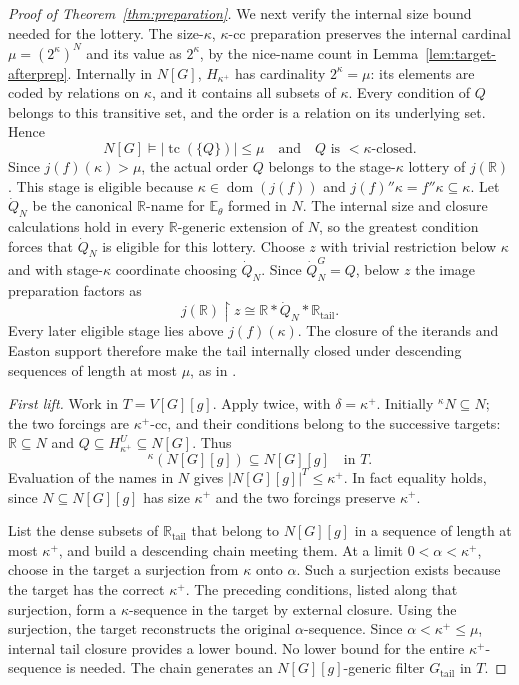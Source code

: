 \documentclass[10pt,a4paper]{amsart}
\theoremstyle{definition}
\theoremstyle{remark}
\newcommand{\RR}{\mathbb R}
\newcommand{\EE}{\mathbb E}
\DeclareMathOperator{\dom}{dom}
\DeclareMathOperator{\tc}{tc}
\begin{document}
\begin{proof}[Proof of Theorem~\ref{thm:preparation}]
We next verify the internal size bound needed for the
lottery. The size-\(\kappa\), \(\kappa\)-cc preparation
preserves the internal cardinal
\(\mu=(2^\kappa)^N\) and its value as \(2^\kappa\),
by the nice-name count in
Lemma~\ref{lem:target-afterprep}. Internally in \(N[G]\),
\(H_{\kappa^+}\) has cardinality \(2^\kappa=\mu\):
its elements are coded by relations on \(\kappa\),
and it contains all subsets of \(\kappa\). Every
condition of \(Q\) belongs to this transitive set,
and the order is a relation on its underlying set.
Hence
\[
 N[G]\models |\tc(\{Q\})|\leq\mu
                   \quad\text{and}\quad
                   Q\text{ is }<\kappa\text{-closed}.
\]
Since \(j(f)(\kappa)>\mu\), the actual order \(Q\)
belongs to the stage-\(\kappa\) lottery of \(j(\RR)\).
This stage is eligible because
\(\kappa\in\dom(j(f))\) and
\(j(f)''\kappa=f''\kappa\subseteq\kappa\).
Let \(\dot Q_N\) be the canonical \(\RR\)-name for
\(\EE_\theta\) formed in \(N\). The internal size
and closure calculations hold in every
\(\RR\)-generic extension of \(N\), so the greatest
condition forces that \(\dot Q_N\) is eligible for
this lottery. Choose \(z\) with trivial restriction
below \(\kappa\) and with stage-\(\kappa\) coordinate
choosing \(\dot Q_N\). Since \(\dot Q_N^G=Q\), below
\(z\) the image preparation factors as
\[
 j(\RR)\restriction z
       \cong\RR*\dot Q_N*\RR_{\mathrm{tail}}.
\]
Every later eligible stage lies above
\(j(f)(\kappa)\). The closure of the iterands and
Easton support therefore make the tail internally
closed under descending sequences of length at most
\(\mu\), as in \cite[p.~1229]{Johnstone}.

\emph{First lift.} Work in \(T=V[G][g]\). Apply
\cite[Fact 14(3)]{Johnstone} twice, with
\(\delta=\kappa^+\). Initially
\({}^\kappa N\subseteq N\); the two forcings are
\(\kappa^+\)-cc, and their conditions belong to the
successive targets:
\(\RR\subseteq N\) and
\(Q\subseteq H_{\kappa^+}^U\subseteq N[G]\).
Thus
\[
 {}^\kappa(N[G][g])\subseteq N[G][g]
                                           \quad\text{in }T.
\]
Evaluation of the names in \(N\) gives
\(|N[G][g]|^T\leq\kappa^+\). In fact equality holds,
since \(N\subseteq N[G][g]\) has size \(\kappa^+\)
and the two forcings preserve \(\kappa^+\).

List the dense subsets of \(\RR_{\mathrm{tail}}\) that belong
to \(N[G][g]\) in a sequence of length at most \(\kappa^+\),
and build a descending chain meeting them. At a limit
\(0<\alpha<\kappa^+\), choose in the target a
surjection from \(\kappa\) onto \(\alpha\). Such a
surjection exists because the target has the correct
\(\kappa^+\). The preceding conditions, listed along
that surjection, form a \(\kappa\)-sequence in the
target by external closure. Using the surjection,
the target reconstructs the original
\(\alpha\)-sequence. Since \(\alpha<\kappa^+\leq\mu\),
internal tail closure provides a lower bound. No
lower bound for the entire \(\kappa^+\)-sequence is
needed. The chain generates an
\(N[G][g]\)-generic filter \(G_{\mathrm{tail}}\) in
\(T\).


\end{proof}
\end{document}
